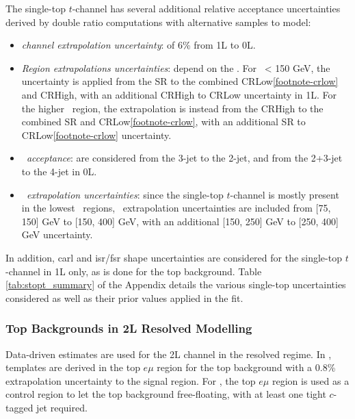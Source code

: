 The single-top $t$-channel has several additional relative acceptance uncertainties derived by double ratio computations with alternative samples to model: 
\begin{itemize}[leftmargin=*]
    \item \textit{channel extrapolation uncertainty}: of 6\% from 1L to 0L.
    \item \textit{Region extrapolations uncertainties}: depend on the \ptv. For \ptv\ < 150 GeV, the uncertainty is applied from the SR to the combined CRLow\cref{footnote-crlow} and CRHigh, with an additional CRHigh to CRLow uncertainty in 1L. For the higher \ptv\ region, the extrapolation is instead from the CRHigh to the combined SR and CRLow\cref{footnote-crlow}, with an additional SR to CRLow\cref{footnote-crlow} uncertainty.
    \item \textit{\nj\ acceptance}: are considered from the 3-jet to the 2-jet, and from the 2+3-jet to the 4-jet in 0L.
    \item \textit{\ptv\ extrapolation uncertainties}: since the single-top $t$-channel is mostly present in the lowest \ptv\ regions, \ptv\ extrapolation uncertainties are included from [75, 150] GeV to [150, 400] GeV, with an additional [150, 250] GeV to [250, 400] GeV uncertainty.
\end{itemize}
In addition, \gls{carl} and \gls{isr}/\gls{fsr} shape uncertainties are considered for the single-top $t$-channel in 1L only, as is done for the top background. Table \ref{tab:stopt_summary} of the Appendix details the various single-top uncertainties considered as well as their prior values applied in the fit.

\subsubsection{Top Backgrounds in 2L Resolved Modelling} 
Data-driven estimates are used for the 2L channel in the resolved regime. In \vhb, templates are derived in the top $e\mu$ region for the top background with a 0.8\% extrapolation uncertainty to the signal region. For \vhc, the top $e\mu$ region is used as a control region to let the top background free-floating, with at least one tight $c$-tagged jet required.

